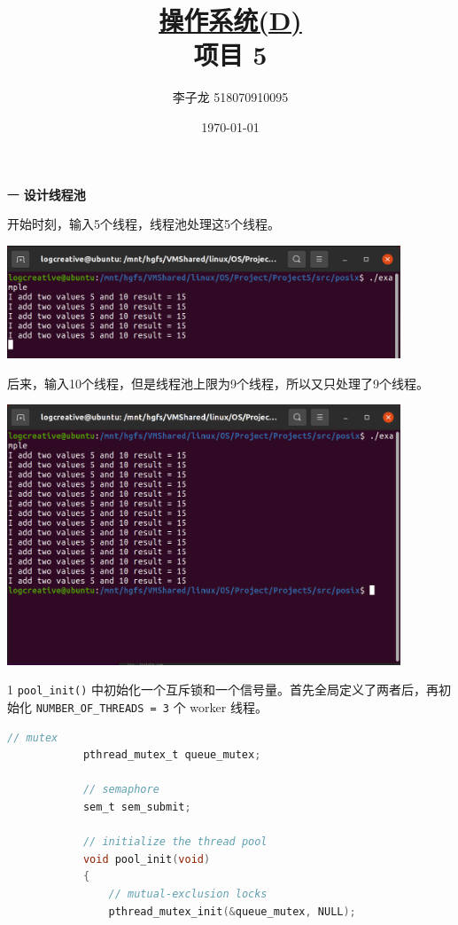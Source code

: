 \documentclass[12pt,a4paper]{article}
\newenvironment{problems}{\begin{list}{}{\renewcommand{\makelabel}[1]{\textbf{##1}\hfil}}}{\end{list}}
\newenvironment{steps}{\begin{list}{}{\renewcommand{\makelabel}[1]{##1.\hfil}}}{\end{list}}
\begin{document}
\title{\normalsize \underline{操作系统(D)}\\\LARGE 项目 5}
\author{李子龙 518070910095}
\date{\today}
\maketitle

\begin{problems}
    \item[一] \textbf{设计线程池}

    开始时刻，输入5个线程，线程池处理这5个线程。

    \includegraphics[width=0.88\textwidth]{threadpool1.png}

    后来，输入10个线程，但是线程池上限为9个线程，所以又只处理了9个线程。
    
    \includegraphics[width=0.88\textwidth]{threadpool2.png}

    \begin{steps}
        \item[1] \verb"pool_init()" 中初始化一个互斥锁和一个信号量。首先全局定义了两者后，再初始化 \verb"NUMBER_OF_THREADS = 3" 个 worker 线程。
        \begin{lstlisting}[language=c]
            // mutex
            pthread_mutex_t queue_mutex;

            // semaphore
            sem_t sem_submit;

            // initialize the thread pool
            void pool_init(void)
            {
                // mutual-exclusion locks
                pthread_mutex_init(&queue_mutex, NULL);
            

\end{lstlisting}
\end{steps}
\end{problems}
\end{document}
